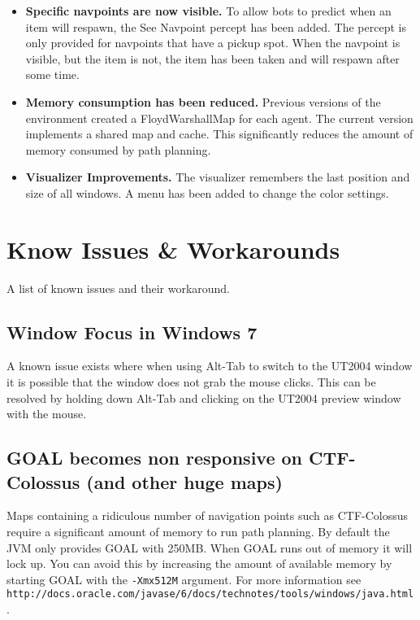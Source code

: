 \documentclass[11pt,a4paper]{article}
\begin{document}
\begin{itemize}
	\item \textbf{Specific navpoints are now visible.} To allow bots to predict when an item will respawn, the See Navpoint percept has been added. The percept is only provided for navpoints that have a pickup spot. When the navpoint is visible, but the item is not, the item has been taken and will respawn after some time.

	\item \textbf{Memory consumption has been reduced.}  Previous versions of the environment created a FloydWarshallMap for each agent. The current version implements a shared map and cache. This significantly reduces the amount of memory consumed by path planning.
	
	\item \textbf{Visualizer Improvements.}  The visualizer remembers the last position and size of all windows. A menu has been added to change the color settings.

\end{itemize}


\section{Know Issues \& Workarounds}

A list of known issues and their workaround.

\subsection{Window Focus in Windows 7}

A known issue exists where when using Alt-Tab to switch to the UT2004 window it is possible that the window does not grab the mouse clicks. This can be resolved by holding down Alt-Tab and clicking on the UT2004 preview window with the mouse.

\subsection{GOAL becomes non responsive on CTF-Colossus (and other huge maps)}

Maps containing a ridiculous number of navigation points such as CTF-Colossus require a significant amount of memory to run path planning. By default the JVM only provides GOAL with 250MB. When GOAL runs out of memory it will lock up. You can avoid this by increasing the amount of available memory  by starting GOAL with the \texttt{-Xmx512M} argument. For more information see \texttt{http://docs.oracle.com/javase/6/docs/technotes/tools/windows/java.html }.
\end{document}
